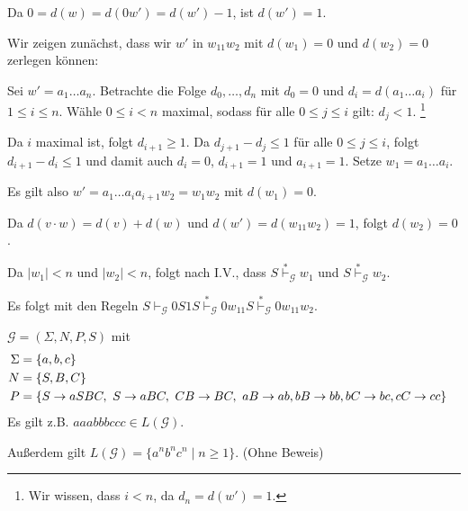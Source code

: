 \begin{Bsp}
\begin{description}[font=\normalfont]
  Da $0 = d(w) = d(0w') = d(w') - 1$, ist $d(w') = 1$.
  
  \medskip

  Wir zeigen zunächst, dass wir $w'$ in $w_11w_2$ mit $d(w_1) = 0$ und $d(w_2) = 0$ zerlegen können:

    Sei $w' = a_1 \ldots a_n$.
    Betrachte die Folge $d_0,\ldots,d_n$ mit $d_0 = 0$ und $d_i = d(a_1\ldots a_i)$ für $1 \le i \leq n$.
    Wähle $0 \le i < n$ maximal, sodass für alle $0 \le j \le i$ gilt: $d_j < 1$.%
    \footnote{Wir wissen, dass $i < n$, da $d_n = d(w') = 1$.}

    Da $i$ maximal ist, folgt $d_{i+1} \ge 1$.
    Da $d_{j+1} - d_j \le 1$ für alle $0 \le j \le i$, folgt $d_{i+1} - d_i \le 1$ und damit auch $d_i = 0$, $d_{i+1} = 1$ und $a_{i+1} = 1$.
    Setze $w_1 = a_1\ldots a_{i}$.

    Es gilt also $w' = a_1\ldots a_{i}a_{i+1}w_2 = w_1w_2$ mit $d(w_1) = 0$.

    Da $d(v \cdot w) = d(v) + d(w)$ und $d(w') = d(w_11w_2) = 1$, folgt $d(w_2) = 0$.
  \bigskip
  \goodbreak

  Da $|w_1| < n$ und $|w_2| < n$, folgt nach I.V., dass $S \stackrel{*}{\vdash}_{\mathcal{G}} w_1$ und $S \stackrel{*}{\vdash}_{\mathcal{G}} w_2$.

  Es folgt mit den Regeln $S \vdash_{\mathcal{G}} 0S1S \stackrel{*}{\vdash}_{\mathcal{G}} 0w_11S \stackrel{*}{\vdash}_{\mathcal{G}} 0w_11w_2$.
  \qedhere
\end{description}
\end{Bsp}

\begin{Bsp}\label{bsp:3.anbncn}
	$\mathcal{G}=(\Sigma,N,P,S)$ mit
	\begin{align*}
		\Sigma &= \{a,b,c\}\\
		N &= \{S,B,C\}\\
		P &= 
		\begin{aligned}[t]
			 \{ &S \-> aSBC,\ S\->aBC,\ CB\-> BC,\ aB\-> ab,
			bB\-> bb, bC\-> bc, cC\-> cc \}
		\end{aligned}
	\end{align*}
Es gilt z.B. $aaabbbccc\in L(\mathcal{G})$.

Außerdem gilt $L(\mathcal{G}) =  \{ a^nb^nc^n \mid n\geq 1 \}$. (Ohne Beweis)
\end{Bsp}

